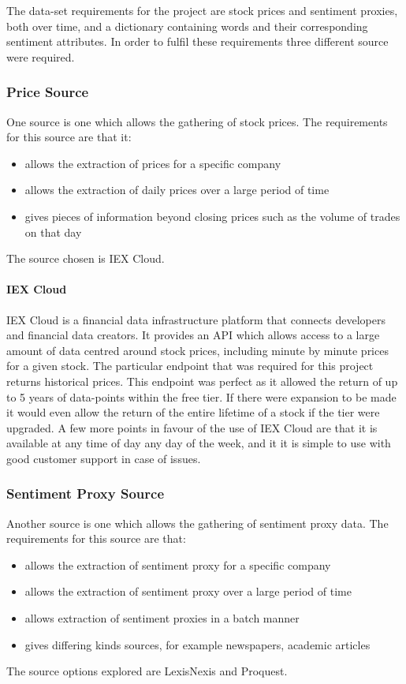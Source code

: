 The data-set requirements for the project are stock prices and sentiment proxies, both over time, and a dictionary containing words and their corresponding sentiment attributes. In order to fulfil these requirements three different source were required.

\subsubsection{Price Source}

One source is one which allows the gathering of stock prices. The requirements for this source are that it:
\begin{itemize}
    \item allows the extraction of prices for a specific company
    \item allows the extraction of daily prices over a large period of time
    \item gives pieces of information beyond closing prices such as the volume of trades on that day
\end{itemize}
The source chosen is IEX Cloud.

\paragraph{IEX Cloud}

IEX Cloud\cite{iexcloud} is a financial data infrastructure platform that connects developers and financial data creators. It provides an API which allows access to a large amount of data centred around stock prices, including minute by minute prices for a given stock. The particular endpoint that was required for this project returns historical prices. This endpoint was perfect as it allowed the return of up to 5 years of data-points within the free tier. If there were expansion to be made it would even allow the return of the entire lifetime of a stock if the tier were upgraded. A few more points in favour of the use of IEX Cloud are that it is available at any time of day any day of the week, and it it is simple to use with good customer support in case of issues.

\subsubsection{Sentiment Proxy Source}

Another source is one which allows the gathering of sentiment proxy data. The requirements for this source are that:
\begin{itemize}
    \item allows the extraction of sentiment proxy for a specific company
    \item allows the extraction of sentiment proxy over a large period of time
    \item allows extraction of sentiment proxies in a batch manner
    \item gives differing kinds sources, for example newspapers, academic articles
\end{itemize}
The source options explored are LexisNexis and Proquest.

